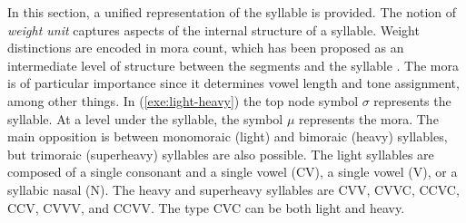 In this section,  a unified representation of the syllable is provided. The
notion
of  {\it weight unit} captures aspects of the internal structure of a syllable. Weight distinctions are encoded in mora count, which has been proposed as an intermediate
level of structure between the segments and the syllable \citep{Hyma85}.   The mora is of particular importance since it determines vowel length and  tone assignment, among other things.   In (\ref{exe:light-heavy}) the top node symbol $\sigma$ represents the syllable. At a level under the syllable, the symbol $\mu$ represents the mora.  The main opposition is between monomoraic (light) and bimoraic (heavy) syllables, but trimoraic (superheavy)  syllables are also possible. The light syllables are composed of  a single consonant and a single vowel (CV),  a single vowel (V), or  a syllabic nasal (N). The heavy and superheavy syllables are  CVV,  CVVC, CCVC, CCV, CVVV, and  CCVV. The type CVC can be both light and heavy.   

 

